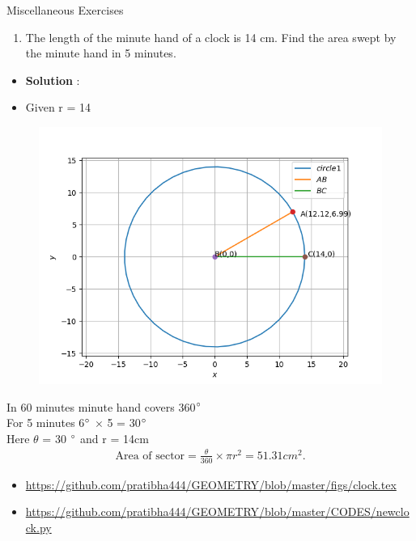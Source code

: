 \begin{frame}{Miscellaneous Exercises}
\begin{enumerate}
\conti
\item The length of the
minute hand of a clock is 14 cm. Find the area
swept by the minute hand in 5 minutes.\\
\seti
\end{enumerate}
\begin{itemize}
\item \textbf{Solution} :
\item Given r = 14 
\begin{figure}[!ht]
\resizebox{0.5\linewidth}{!}
{

}

\end{figure}


\end{itemize}
\end{frame}
\begin{frame}
\begin{figure}
\includegraphics[scale=.6]{./CODES/MISC.png}
\end{figure}
\end{frame}
\begin{frame}

 In 60 minutes minute hand covers  360$\degree$\\
For 5 minutes 6$\degree$ $\times$ 5 = 30$\degree$\\ 
Here $\theta$ = 30 $\degree$ and r = 14cm\\

\begin{align*}
	\text{Area of sector} = \frac{\theta}{360} \times \pi r^2
	=51.31cm^2.
\end{align*}   
\begin{itemize}
\item \url {https://github.com/pratibha444/GEOMETRY/blob/master/figs/clock.tex} 
\item \url{https://github.com/pratibha444/GEOMETRY/blob/master/CODES/newclock.py}
\end{itemize}             
\end{frame}
